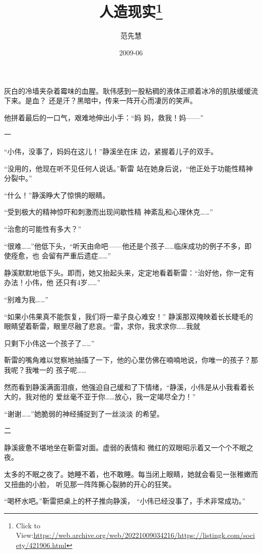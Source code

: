 \documentclass{article}
\title{人造现实\footnote{Click to View:\url{https://web.archive.org/web/20221009034216/https://listingk.com/society/421906.html}}}
\author{范先慧}
\date{2009-06}
\begin{document}

\maketitle


\Large

﻿灰白的冷墙夹杂着霉味的血腥。耿伟感到一股粘稠的液体正顺着冰冷的肌肤缓缓流下来。是血？
还是汗？黑暗中，传来一阵开心而凄厉的笑声。 

他拼着最后的一口气，艰难地伸出小手：“妈
妈，救我！妈——” 


一 

“小伟，没事了，妈妈在这儿！”静溪坐在床
边，紧握着儿子的双手。 

“没用的，他现在听不见任何人说话。”靳雷
站在她身后说，“他正处于功能性精神分裂中。” 

\newpage


“什么！”静溪睁大了惊惧的眼睛。 

“受到极大的精神惊吓和刺激而出现间歇性精
神紊乱和心理休克……” 


“治愈的可能性有多大？” 

“很难……”他低下头，“听天由命吧——他还是个孩子……临床成功的例子不多，即使痊愈，也
会留有严重后遗症……” 

静溪默默地低下头。即而，她又抬起头来，定定地看着靳雷：“治好他，你一定有办法！小伟，他
还只有4岁……” 


“别难为我……” 

“如果小伟果真不能恢复，我们将一辈子良心难安！” 静溪那双掩映着长长睫毛的眼睛望着靳雷，眼里尽融了悲哀。“雷，求你，我求求你……我就

\newpage
只剩下小伟这一个孩子了……” 

靳雷的嘴角难以觉察地抽搐了一下，他的心里仿佛在喃喃地说，你唯一的孩子？那我呢？我唯一的
孩子呢…… 

然而看到静溪满面泪痕，他强迫自己缓和了下情绪，“静溪，小伟是从小我看着长大的，我对他的
爱丝毫不亚于你……放心，我一定竭尽全力！” 

“谢谢……”她脆弱的神经捕捉到了一丝淡淡
的希望。 


二 

静溪疲惫不堪地坐在靳雷对面。虚弱的表情和
微红的双眼昭示着又一个个不眠之夜。 

太多的不眠之夜了。她睡不着，也不敢睡。每当闭上眼睛，她就会看见一张稚嫩而又扭曲的小脸，
听见那一阵阵撕心裂肺的开心的狂笑。 

\newpage

“喝杯水吧。”靳雷把桌上的杯子推向静溪，
“小伟已经没事了，手术非常成功。” 
\end{document}
